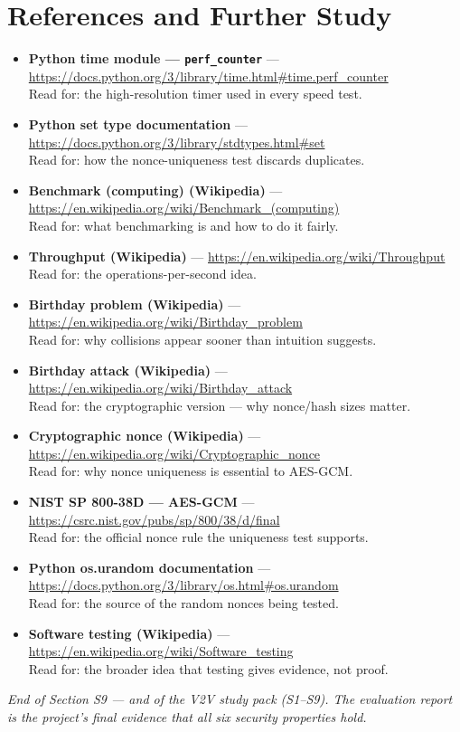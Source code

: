 \documentclass[11pt,a4paper]{report}
\begin{document}
\section{References and Further Study}
\begin{itemize}
  \item \textbf{Python time module --- \texttt{perf\_counter}} ---
        \url{https://docs.python.org/3/library/time.html#time.perf_counter}\\
        Read for: the high-resolution timer used in every speed test.
  \item \textbf{Python set type documentation} ---
        \url{https://docs.python.org/3/library/stdtypes.html#set}\\
        Read for: how the nonce-uniqueness test discards duplicates.
  \item \textbf{Benchmark (computing) (Wikipedia)} ---
        \url{https://en.wikipedia.org/wiki/Benchmark_(computing)}\\
        Read for: what benchmarking is and how to do it fairly.
  \item \textbf{Throughput (Wikipedia)} ---
        \url{https://en.wikipedia.org/wiki/Throughput}\\
        Read for: the operations-per-second idea.
  \item \textbf{Birthday problem (Wikipedia)} ---
        \url{https://en.wikipedia.org/wiki/Birthday_problem}\\
        Read for: why collisions appear sooner than intuition suggests.
  \item \textbf{Birthday attack (Wikipedia)} ---
        \url{https://en.wikipedia.org/wiki/Birthday_attack}\\
        Read for: the cryptographic version --- why nonce/hash sizes matter.
  \item \textbf{Cryptographic nonce (Wikipedia)} ---
        \url{https://en.wikipedia.org/wiki/Cryptographic_nonce}\\
        Read for: why nonce uniqueness is essential to AES-GCM.
  \item \textbf{NIST SP 800-38D --- AES-GCM} ---
        \url{https://csrc.nist.gov/pubs/sp/800/38/d/final}\\
        Read for: the official nonce rule the uniqueness test supports.
  \item \textbf{Python os.urandom documentation} ---
        \url{https://docs.python.org/3/library/os.html#os.urandom}\\
        Read for: the source of the random nonces being tested.
  \item \textbf{Software testing (Wikipedia)} ---
        \url{https://en.wikipedia.org/wiki/Software_testing}\\
        Read for: the broader idea that testing gives evidence, not proof.
\end{itemize}

\vfill
\begin{center}\footnotesize\itshape
End of Section S9 --- and of the V2V study pack (S1--S9). The evaluation report
is the project's final evidence that all six security properties hold.
\end{center}
\end{document}
